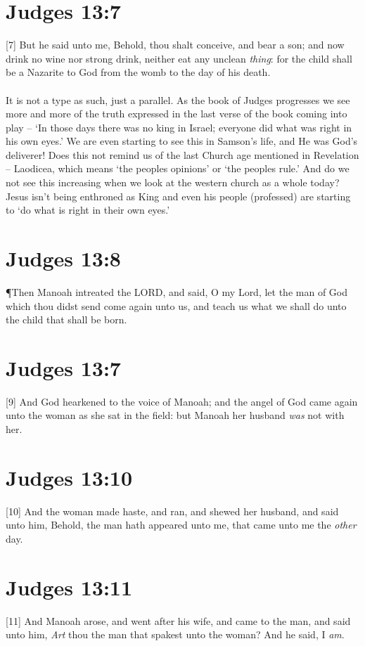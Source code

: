 \section{Judges 13:7}
[7] \textcolor[rgb]{0.00,0.00,1.00}{But he said unto me, Behold, thou shalt conceive, and bear a son; and now drink no wine nor strong drink, neither eat any unclean \emph{thing}: for the child shall be a Nazarite to God from the womb to the day of his death.}\\
\\
It is not a type as such, just a parallel. As the book of Judges progresses we see more and more of the truth expressed in the last verse of the book coming into play -- ‘In those days there was no king in Israel; everyone did what was right in his own eyes.’ We are even starting to see this in Samson’s life, and He was God’s deliverer! Does this not remind us of the last Church age mentioned in Revelation – Laodicea, which means ‘the peoples opinions’ or ‘the peoples rule.’ And do we not see this increasing when we look at the western church as a whole today? Jesus isn’t being enthroned as King and even his people (professed) are starting to ‘do what is right in their own eyes.’
\section{Judges 13:8}
\P \textcolor[rgb]{0.00,0.00,1.00}{Then Manoah intreated the LORD, and said, O my Lord, let the man of God which thou didst send come again unto us, and teach us what we shall do unto the child that shall be born.}
\section{Judges 13:7}
[9] \textcolor[rgb]{0.00,0.00,1.00}{And God hearkened to the voice of Manoah; and the angel of God came again unto the woman as she sat in the field: but Manoah her husband \emph{was} not with her.}
\section{Judges 13:10}
[10] \textcolor[rgb]{0.00,0.00,1.00}{And the woman made haste, and ran, and shewed her husband, and said unto him, Behold, the man hath appeared unto me, that came unto me the \emph{other} day.}
\section{Judges 13:11}
[11] \textcolor[rgb]{0.00,0.00,1.00}{And Manoah arose, and went after his wife, and came to the man, and said unto him, \emph{Art} thou the man that spakest unto the woman? And he said, I \emph{am}.}
